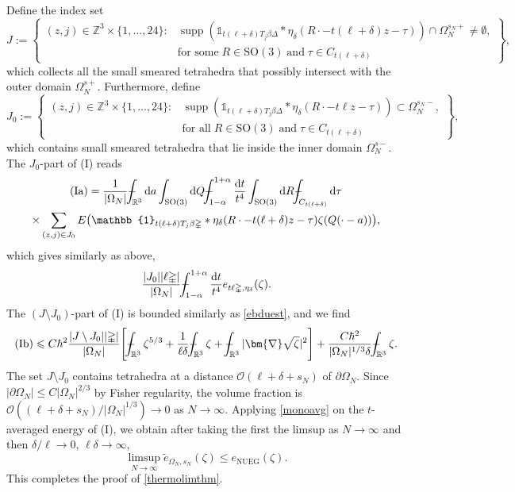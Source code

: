 \documentclass[final,onefignum,onetabnum,reqno]{amsart}
\theoremstyle{remark}
\renewcommand{\le}{\leqslant}
\newcommand{\wt}[1]{\widetilde{#1}}
\DeclareMathOperator{\supp}{supp}
\newcommand{\RR}{\mathbb{R}}
\newcommand{\ZZ}{\mathbb{Z}}
\newcommand{\SO}{\mathrm{SO}}
\newcommand{\NUEG}{\mathrm{NUEG}} %
\newcommand{\iden}{\mathbb{1}} %
\newcommand{\grad}{\bm{\nabla}} %
\newcommand{\tetra}{\mathbb{\Delta}} %
\newcommand{\dd}{\mathrm{d}} %
\def\Xint#1{\mathchoice
{\XXint\displaystyle\textstyle{#1}}%
{\XXint\textstyle\scriptstyle{#1}}%
{\XXint\scriptstyle\scriptscriptstyle{#1}}%
{\XXint\scriptscriptstyle\scriptscriptstyle{#1}}%
\!\int}
\def\XXint#1#2#3{{\setbox0=\hbox{$#1{#2#3}{\int}$ }
\vcenter{\hbox{$#2#3$ }}\kern-.6\wd0}}
\def\dashint{\Xint-}
\newcommand{\OC}{\mathcal{O}}
\begin{document}
Define the index set
$$
J:=\left\{ \begin{aligned}(z,j)\in \ZZ^3\times\{1,\ldots,24\} : &\supp( \iden_{t(\ell+\delta) T_j\beta\tetra} * \eta_\delta(R\cdot - t(\ell+\delta) z - \tau)) \cap \Omega_N^{s_N+}\neq \emptyset,\\
&\text{for some}\;R\in\SO(3)\;\text{and}\; \tau\in C_{t(\ell+\delta)} \end{aligned} \right\},
$$
which collects all the small smeared tetrahedra that possibly intersect with the outer domain $\Omega_N^{s+}$. Furthermore, define
$$
J_0:=\left\{ \begin{aligned}(z,j)\in \ZZ^3\times\{1,\ldots,24\} : &\supp(\iden_{t(\ell+\delta) T_j\beta\tetra} * \eta_\delta(R\cdot - t\ell z - \tau)) \subset \Omega_N^{s_N-},\\
&\text{for all}\;R\in\SO(3)\;\text{and}\; \tau\in C_{t(\ell+\delta)} \end{aligned} \right\},
$$
which contains small smeared tetrahedra that lie inside the inner domain $\Omega_N^{s-}$.
The $J_0$-part of (I) reads
\begin{multline*}
\mathrm{(Ia)}=\frac{1}{|\Omega_N|}\dashint_{\RR^3}\dd a\int_{\SO(3)}\dd Q \dashint_{1-\alpha}^{1+\alpha}\frac{\dd t}{t^4} \int_{\SO(3)}\dd R \dashint_{C_{t(\ell+\delta)}}\dd\tau \\
\times \sum_{(z,j)\in J_0} E\bigl(\iden_{t(\ell+\delta) T_j\beta\tetra} * \eta_\delta(R\cdot - t(\ell+\delta) z - \tau)\zeta(Q(\cdot-a))\bigr),
\end{multline*}
which gives similarly as above,
$$
\frac{|J_0||\ell\tetra|}{|\Omega_N|} \dashint_{1-\alpha}^{1+\alpha}\frac{\dd t}{t^4} e_{t\ell\tetra,\eta_\delta}(\zeta).
$$
The $(J\setminus J_0)$-part of (I) is bounded similarly as \cref{ebduest}, and we find
$$
\mathrm{(Ib)}\le C\hbar^2 \frac{|J\setminus J_0||\tetra|}{|\Omega_N|}\Bigg[ \dashint_{\RR^3} \zeta^{5/3} + \frac{1}{\ell\delta}\dashint_{\RR^3}\zeta + \dashint_{\RR^3} |\grad\sqrt{\zeta}|^2\Bigg] + \frac{C\hbar^2}{|\Omega_N|^{1/3}\delta}\dashint_{\RR^3}\zeta.
$$
The set $J \setminus J_0$ contains tetrahedra at a distance $\OC(\ell + \delta + s_N)$ of $\partial\Omega_N$. Since $|\partial\Omega_N|\le C |\Omega_N|^{2/3}$ by Fisher regularity, the volume fraction is $\OC((\ell + \delta + s_N)/|\Omega_N|^{1/3}) \to 0$ as $N\to\infty$. 
Applying \cref{monoavg} on the $t$-averaged energy of (I), we obtain after taking the first the limsup as $N\to\infty$ and then $\delta/\ell\to 0$, $\ell\delta\to\infty$,
$$
\limsup_{N\to\infty} \wt{e}_{\Omega_N,s_N}(\zeta)\le e_\NUEG(\zeta).
$$
This completes the proof of \cref{thermolimthm}.
\end{document}
